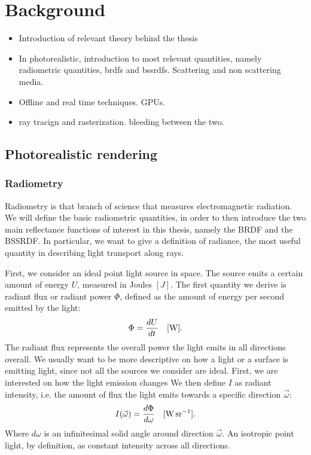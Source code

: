 \chapter{Background}
\label{sec:background}
\begin{itemize}
\item Introduction of relevant theory behind the thesis
\item In photorealistic, introduction to most relevant quantities, namely radiometric quantities, brdfs and bssrdfs. Scattering and non scattering media.
\item Offline and real time techniques. GPUs. 
\item ray tracign and rasterization. bleeding between the two.
\end{itemize}

\section{Photorealistic rendering}

\subsection{Radiometry}
Radiometry is that branch of science that measures electromagnetic radiation. We will define the basic radiometric quantities, in order to then introduce the two main reflectance functions of interest in this thesis, namely the BRDF and the BSSRDF. In particular, we want to give a definition of radiance, the most useful quantity in describing light transport along rays.

First, we consider an ideal point light source in space. The source emits a certain amount of energy $U$, measured in Joules $[J]$. The first quantity we derive is radiant flux or radiant power $\Phi$, defined as the amount of energy per second emitted by the light:
$$
\Phi = \frac{d U}{d t}  \ \ \ [\SI{}{\watt}].
$$
The radiant flux represents the overall power the light emits in all directions overall. We usually want to be more descriptive on how a light or a surface is emitting light, since not all the sources we consider are ideal. First, we are interested on how the light emission changes  We then define $I$ as radiant intensity, i.e. the amount of flux the light emits towards a specific direction $\vec{\omega}$:
$$
I(\vec{\omega}) = \frac{d \Phi}{d \omega}  \siunit{\watt \per \steradian}.
$$   
Where $d \omega$ is an infinitesimal solid angle around direction $\vec{\omega}$. An isotropic point light, by definition, as constant intensity across all directions.

